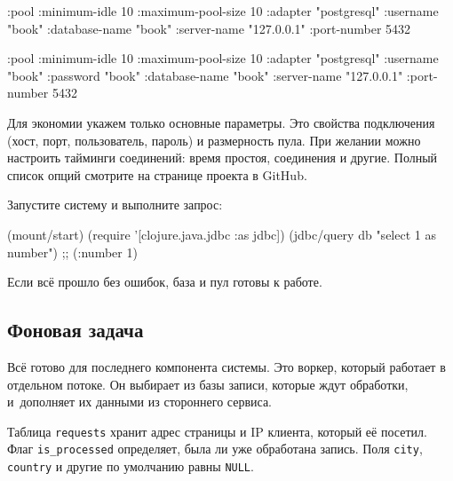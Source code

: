 \ifafive

\begin{english}
  \begin{clojure}
{:pool {:minimum-idle       10
        :maximum-pool-size  10
        :adapter            "postgresql"
        :username           "book"
        :database-name      "book"
        :server-name        "127.0.0.1"
        :port-number        5432}}
  \end{clojure}
\end{english}

\else

\begin{english}
  \begin{clojure}
{:pool {:minimum-idle       10
        :maximum-pool-size  10
        :adapter            "postgresql"
        :username           "book"
        :password           "book"
        :database-name      "book"
        :server-name        "127.0.0.1"
        :port-number        5432}}
  \end{clojure}
\end{english}

\fi

Для экономии укажем только основные параметры. Это свойства подключения (хост,
порт, пользователь, пароль) и размерность пула. При желании можно настроить
тайминги соединений: время простоя, соединения и другие. Полный список опций
смотрите на странице проекта в GitHub.

Запустите систему и выполните запрос:

\begin{english}
  \begin{clojure}
(mount/start)
(require '[clojure.java.jdbc :as jdbc])
(jdbc/query db "select 1 as number")
;; ({:number 1})
  \end{clojure}
\end{english}

Если всё прошло без ошибок, база и пул готовы к работе.

\subsection{Фоновая задача}

\label{worker}

Всё готово для последнего компонента системы. Это воркер, который работает в
отдельном потоке. Он выбирает из базы записи, которые ждут обработки,
и~дополняет их данными из стороннего сервиса.

Таблица \verb|requests| хранит адрес страницы и IP клиента, который её
посетил. Флаг \verb|is_processed| определяет, была ли уже обработана
запись. Поля \verb|city|, \verb|country| и другие по умолчанию равны
\verb|NULL|.

